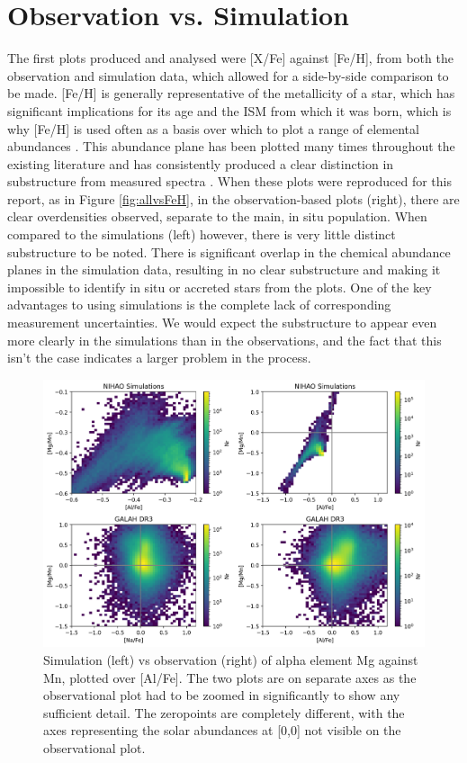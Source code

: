 \documentclass[fleqn,usenatbib]{mnras}
\begin{document}
\section{Observation vs. Simulation}
\label{sec:obs_vs_sim}
The first plots produced and analysed were [X/Fe] against [Fe/H], from both the observation and simulation data, which allowed for a side-by-side comparison to be made. [Fe/H] is generally representative of the metallicity of a star, which has significant implications for its age and the ISM from which it was born, which is why [Fe/H] is used often as a basis over which to plot a range of elemental abundances \citep{Buder2022}.  
This abundance plane has been plotted many times throughout the existing literature and has consistently produced a clear distinction in substructure from measured spectra \citep{Das2020, Nissen2010}. When these plots were reproduced for this report, as in Figure \ref{fig:allvsFeH}, in the observation-based plots (right), there are clear overdensities observed, separate to the main, in situ population. When compared to the simulations (left) however, there is very little distinct substructure to be noted. There is significant overlap in the chemical abundance planes in the simulation data, resulting in no clear substructure and making it impossible to identify in situ or accreted stars from the plots.  
One of the key advantages to using simulations is the complete lack of corresponding measurement uncertainties. We would expect the substructure to appear even more clearly in the simulations than in the observations, and the fact that this isn't the case indicates a larger problem in the process. 
\begin{figure}
	\includegraphics[width=\textwidth]{figures/[MgMn] vs [AlFe].png}
    \caption{Simulation (left) vs observation (right) of alpha element Mg against Mn, plotted over [Al/Fe]. The two plots are on separate axes as the observational plot had to be zoomed in significantly to show any sufficient detail. The zeropoints are completely different, with the axes representing the solar abundances at [0,0] not visible on the observational plot.}
    \label{fig:alpha}
\end{figure}
\end{document}
